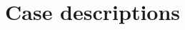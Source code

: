 \documentclass[12pt,twoside]{report}
\begin{document}
\chapter{Case descriptions}



%
%
%
%
%
%
%


\pagebreak





%
%
%
%
%
%
%
%
%
\end{document}
